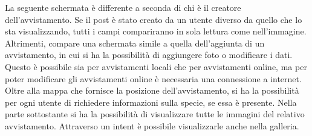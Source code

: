 \documentclass[a4paper,final,12pt]{report}
\begin{document}
La seguente schermata è differente a seconda di chi è il creatore dell'avvistamento. Se il post è stato creato da un utente diverso da quello che lo sta visualizzando, tutti i campi compariranno in sola lettura come nell'immagine. Altrimenti, compare una schermata simile a quella dell'aggiunta di un avvistamento, in cui si ha la possibilità di aggiungere foto o modificare i dati. Questo è possibile sia per avvistamenti locali che per avvistamenti online, ma per poter modificare gli avvistamenti online è necessaria una connessione a internet. Oltre alla mappa che fornisce la posizione dell'avvistamento, si ha la possibilità per ogni utente di richiedere informazioni sulla specie, se essa è presente. Nella parte sottostante si ha la possibilità di visualizzare tutte le immagini del relativo avvistamento. Attraverso un intent è possibile visualizzarle anche nella galleria.
\end{document}
